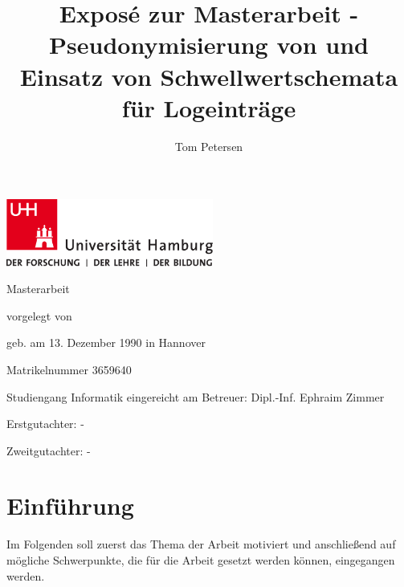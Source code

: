 \documentclass[
    fontsize=12pt,
    headings=small,
    parskip=half,           %
    bibliography=totoc,
    numbers=noenddot,       %
    open=any,               %
   final                   %
    ]{scrreprt}
\title{Exposé zur Masterarbeit - Pseudonymisierung von und Einsatz von Schwellwertschemata für Logeinträge}
\author{Tom Petersen}
\begin{document}
\newpage
\thispagestyle{empty}
\begin{titlepage}%
\includegraphics[width=6.8cm]{./img/up-uhh-logo-u-2010-u-farbe-u-rgb.pdf}
\begin{center}\Large
	\vfill
	Masterarbeit
	\vfill
	\makeatletter
	{\Large\textsf{\textbf{\@title}}\par}
	\makeatother
	\vfill
	vorgelegt von
	\par\bigskip
	\makeatletter
	{\@author} \par
	\makeatother
	geb. am 13. Dezember 1990 in Hannover\par
	Matrikelnummer 3659640 \par
	Studiengang Informatik
	\vfill
	\makeatletter
	eingereicht am {\@date}
	\makeatother
	\vfill
	Betreuer: Dipl.-Inf. Ephraim Zimmer\par
	Erstgutachter: - \par
	Zweitgutachter: -
\end{center}
\end{titlepage}%



\chapter{Einführung}

Im Folgenden soll zuerst das Thema der Arbeit motiviert und anschließend auf mögliche Schwerpunkte, die für die Arbeit gesetzt werden können, eingegangen werden.
\end{document}
